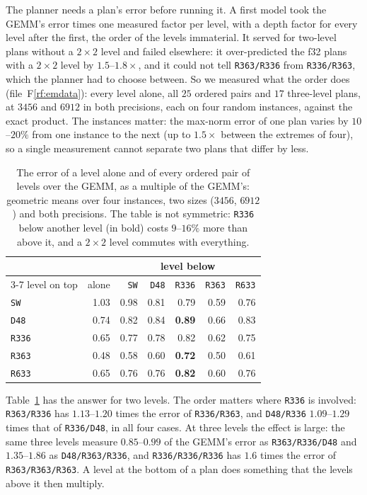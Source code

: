 \documentclass[11pt]{article}
\newcommand{\rf}[1]{F\ref{rf:#1}}
\newcommand{\lv}[1]{\texttt{#1}}
\begin{document}
The planner needs a plan's error before running it.  A first model took the
GEMM's error times one measured factor per level, with a depth factor for
every level after the first, the order of the levels immaterial.  It served
for two-level plans without a $2\times2$ level and failed elsewhere: it
over-predicted the f32 plans with a $2\times2$ level by $1.5$--$1.8\times$,
and it could not tell \lv{R363/R336} from \lv{R336/R363}, which the planner
had to choose between.  So we measured what the order does
(file~\rf{emdata}): every level alone, all $25$ ordered pairs and $17$
three-level plans, at $3456$ and $6912$ in both precisions, each on four
random instances, against the exact product.  The instances matter: the
max-norm error of one plan varies by $10$--$20\%$ from one instance to the
next (up to $1.5\times$ between the extremes of four), so a single
measurement cannot separate two plans that differ by less.

\begin{table}[!tbp]
\centering\footnotesize
\begin{tabular}{lrrrrrr}
\toprule
 & & \multicolumn{5}{c}{level below}\\
\cmidrule(lr){3-7}
level on top & alone & \lv{SW} & \lv{D48} & \lv{R336} & \lv{R363} & \lv{R633}\\
\midrule
\lv{SW}   & 1.03 & 0.98 & 0.81 & 0.79 & 0.59 & 0.76\\
\lv{D48}  & 0.74 & 0.82 & 0.84 & \textbf{0.89} & 0.66 & 0.83\\
\lv{R336} & 0.65 & 0.77 & 0.78 & 0.82 & 0.62 & 0.75\\
\lv{R363} & 0.48 & 0.58 & 0.60 & \textbf{0.72} & 0.50 & 0.61\\
\lv{R633} & 0.65 & 0.76 & 0.76 & \textbf{0.82} & 0.60 & 0.76\\
\bottomrule
\end{tabular}
\caption{The error of a level alone and of every ordered pair of levels over
the GEMM, as a multiple of the GEMM's: geometric means over four instances,
two sizes ($3456$, $6912$) and both precisions.  The table is not symmetric:
\lv{R336} below another level (in bold) costs $9$--$16\%$ more than above
it, and a $2\times2$ level commutes with everything.}
\label{tab:pairs}
\end{table}

Table~\ref{tab:pairs} has the answer for two levels.  The order matters
where \lv{R336} is involved: \lv{R363/R336} has $1.13$--$1.20$ times the
error of \lv{R336/R363}, and \lv{D48/R336} $1.09$--$1.29$ times that of
\lv{R336/D48}, in all four cases.  At three levels the effect is large: the
same three levels measure $0.85$--$0.99$ of the GEMM's error as
\lv{R363/R336/D48} and $1.35$--$1.86$ as \lv{D48/R363/R336}, and
\lv{R336/R336/R336} has $1.6$ times the error of \lv{R363/R363/R363}.  A
level at the bottom of a plan does something that the levels above it then
multiply.
\end{document}
